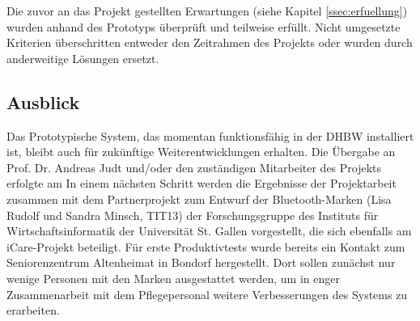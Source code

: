 Die zuvor an das Projekt gestellten Erwartungen (siehe Kapitel \ref{ssec:erfuellung}) wurden anhand des Prototyps überprüft und teilweise erfüllt. Nicht umgesetzte Kriterien überschritten entweder den Zeitrahmen des Projekts oder wurden durch anderweitige Lösungen ersetzt. 
\subsection{Ausblick}
Das Prototypische System, das momentan funktionsfähig in der DHBW installiert ist, bleibt auch für zukünftige Weiterentwicklungen erhalten. Die Übergabe an Prof. Dr. Andreas Judt und/oder den zuständigen Mitarbeiter des Projekts erfolgte am %
In einem nächsten Schritt werden die Ergebnisse der Projektarbeit zusammen mit dem Partnerprojekt zum Entwurf der Bluetooth-Marken (Lisa Rudolf und Sandra Minsch, TIT13) der Forschungsgruppe des Instituts für Wirtschaftsinformatik der Universität St. Gallen vorgestellt, die sich ebenfalls am iCare-Projekt beteiligt. Für erste Produktivtests wurde bereits ein Kontakt zum Seniorenzentrum Altenheimat in Bondorf hergestellt. Dort sollen zunächst nur wenige Personen mit den Marken ausgestattet werden, um in enger Zusammenarbeit mit dem Pflegepersonal weitere Verbesserungen des Systems zu erarbeiten.  
